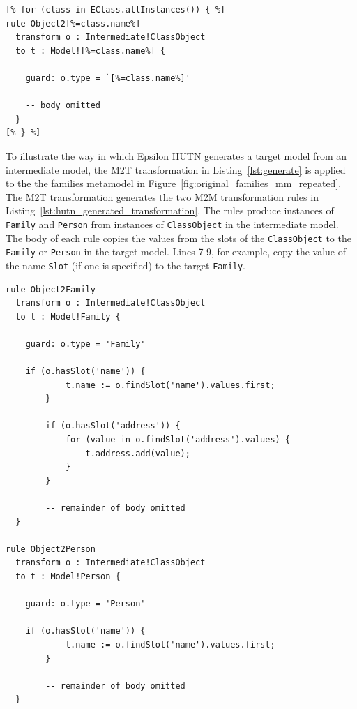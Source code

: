 \begin{lstlisting}[caption={[Higher-order transformation with EGL]Part of the M2T transformation (in EGL) that takes a target metamodel and generates an intermediate model to target model transformation (in ETL).}, label=lst:generate, language=EGL]
[% for (class in EClass.allInstances()) { %]
rule Object2[%=class.name%]
  transform o : Intermediate!ClassObject
  to t : Model![%=class.name%] {

    guard: o.type = `[%=class.name%]'

    -- body omitted
  }
[% } %]
\end{lstlisting}

To illustrate the way in which Epsilon HUTN generates a target model from an intermediate model, the M2T transformation in Listing~\ref{lst:generate} is applied to the the families metamodel in Figure~\ref{fig:original_families_mm_repeated}. The M2T transformation generates the two M2M transformation rules in Listing~\ref{lst:hutn_generated_transformation}. The rules produce instances of \texttt{Fa\-mi\-ly} and \texttt{Pe\-rs\-on} from instances of \texttt{Cl\-a\-ssOb\-je\-ct} in the intermediate model. The body of each rule copies the values from the slots of the \texttt{Cl\-as\-sOb\-je\-ct} to the \texttt{Fa\-mi\-ly} or \texttt{Pe\-rs\-on} in the target model. Lines 7-9, for example, copy the value of the name \texttt{Sl\-ot} (if one is specified) to the target \texttt{Fa\-mi\-ly}.

\begin{lstlisting}[caption=The M2M transformation generated for the Families metamodel, label=lst:hutn_generated_transformation, language=ETL]
rule Object2Family
  transform o : Intermediate!ClassObject
  to t : Model!Family {

    guard: o.type = 'Family'

    if (o.hasSlot('name')) {
			t.name := o.findSlot('name').values.first;
		}
		
		if (o.hasSlot('address')) {
			for (value in o.findSlot('address').values) {
				t.address.add(value);
			}
		}
		
		-- remainder of body omitted
  }

rule Object2Person
  transform o : Intermediate!ClassObject
  to t : Model!Person {

    guard: o.type = 'Person'

    if (o.hasSlot('name')) {
			t.name := o.findSlot('name').values.first;
		}
		
		-- remainder of body omitted
  }
\end{lstlisting}

